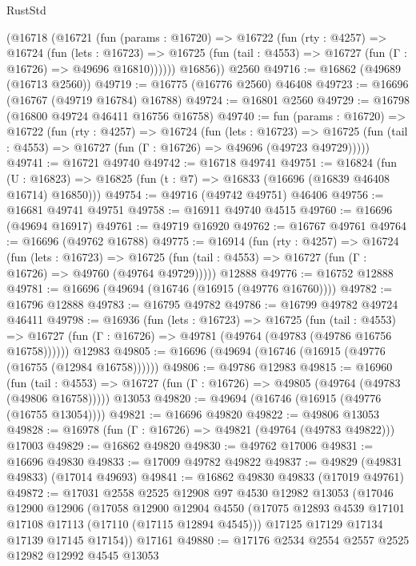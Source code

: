 \begin{lexlean}{RustStd}
\begin{coremodule}
      (@16718
        (@16721
          (fun (params : @16720) =>
          @16722
            (fun (rty : @4257) =>
            @16724
              (fun (lets : @16723) =>
              @16725 (fun (tail : @4553) => @16727 (fun (Γ : @16726) => @49696 @16810))))))
        @16856))
    @2560
@49716 := @16862 (@49689 (@16713 @2560))
@49719 := @16775 (@16776 @2560) @46408
@49723 := @16696 (@16767 (@49719 @16784) @16788)
@49724 := @16801 @2560
@49729 := @16798 (@16800 @49724 @46411 @16756 @16758)
@49740 := fun (params : @16720) =>
  @16722
    (fun (rty : @4257) =>
    @16724
      (fun (lets : @16723) =>
      @16725 (fun (tail : @4553) => @16727 (fun (Γ : @16726) => @49696 (@49723 @49729)))))
@49741 := @16721 @49740
@49742 := @16718 @49741
@49751 := @16824
    (fun (U : @16823) => @16825 (fun (t : @7) => @16833 (@16696 (@16839 @46408 @16714) @16850)))
@49754 := @49716 (@49742 @49751) @46406
@49756 := @16681 @49741 @49751
@49758 := @16911 @49740 @4515
@49760 := @16696 (@49694 @16917)
@49761 := @49719 @16920
@49762 := @16767 @49761
@49764 := @16696 (@49762 @16788)
@49775 := @16914
    (fun (rty : @4257) =>
    @16724
      (fun (lets : @16723) =>
      @16725 (fun (tail : @4553) => @16727 (fun (Γ : @16726) => @49760 (@49764 @49729)))))
    @12888
@49776 := @16752 @12888
@49781 := @16696 (@49694 (@16746 (@16915 (@49776 @16760))))
@49782 := @16796 @12888
@49783 := @16795 @49782
@49786 := @16799 @49782 @49724 @46411
@49798 := @16936
    (fun (lets : @16723) =>
    @16725
      (fun (tail : @4553) =>
      @16727 (fun (Γ : @16726) => @49781 (@49764 (@49783 (@49786 @16756 @16758))))))
    @12983
@49805 := @16696 (@49694 (@16746 (@16915 (@49776 (@16755 (@12984 @16758))))))
@49806 := @49786 @12983
@49815 := @16960
    (fun (tail : @4553) => @16727 (fun (Γ : @16726) => @49805 (@49764 (@49783 (@49806 @16758)))))
    @13053
@49820 := @49694 (@16746 (@16915 (@49776 (@16755 @13054))))
@49821 := @16696 @49820
@49822 := @49806 @13053
@49828 := @16978 (fun (Γ : @16726) => @49821 (@49764 (@49783 @49822))) @17003
@49829 := @16862 @49820
@49830 := @49762 @17006
@49831 := @16696 @49830
@49833 := @17009 @49782 @49822
@49837 := @49829 (@49831 @49833) (@17014 @49693)
@49841 := @16862 @49830 @49833 (@17019 @49761)
@49872 := @17031
    @2558
    @2525
    @12908
    @97
    @4530
    @12982
    @13053
    (@17046
      @12900
      @12906
      (@17058
        @12900
        @12904
        @4550
        (@17075 @12893 @4539 @17101 @17108 @17113 (@17110 (@17115 @12894 @4545)))
        @17125
        @17129
        @17134
        @17139
        @17145
        @17154))
    @17161
@49880 := @17176 @2534 @2554 @2557 @2525 @12982 @12992 @4545 @13053

\end{coremodule}
\end{lexlean}
